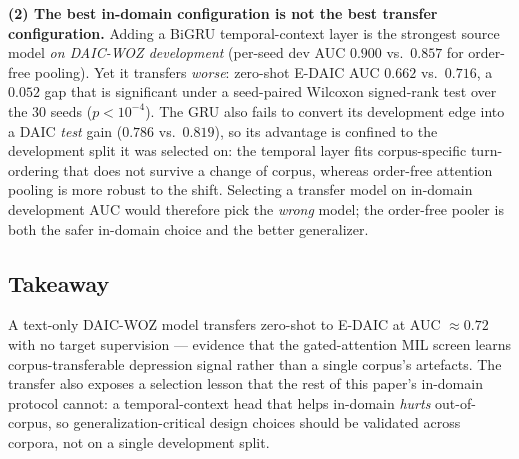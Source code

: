 \textbf{(2) The best in-domain configuration is not the best transfer
configuration.} Adding a BiGRU temporal-context layer is the strongest source
model \emph{on DAIC-WOZ development} (per-seed dev AUC $0.900$ vs.\ $0.857$ for
order-free pooling). Yet it transfers \emph{worse}: zero-shot E-DAIC AUC
$0.662$ vs.\ $0.716$, a $0.052$ gap that is significant under a seed-paired
Wilcoxon signed-rank test over the 30 seeds ($p<10^{-4}$). The GRU also fails to
convert its development edge into a DAIC \emph{test} gain ($0.786$ vs.\ $0.819$),
so its advantage is confined to the development split it was selected on: the
temporal layer fits corpus-specific turn-ordering that does not survive a change
of corpus, whereas order-free attention pooling is more robust to the shift.
Selecting a transfer model on in-domain development AUC would therefore pick the
\emph{wrong} model; the order-free pooler is both the safer in-domain choice and
the better generalizer.

\begin{table}[t]
\caption{Zero-shot cross-corpus transfer. Source: bge-large, participant-only,
gap-merged, trained on DAIC-WOZ; evaluated on E-DAIC with no target adaptation.
ROC-AUC as 30-seed per-seed mean$\pm$std; the E-DAIC column adds a subject-level
bootstrap 95\% CI (2000 resamples of the 56 test subjects) on the seed-ensemble.
The order-free model wins the transfer despite the GRU winning the DAIC
development split.}
\label{tab:edaic}
\centering\small
\setlength{\tabcolsep}{4pt}
\end{table}

\subsection{Takeaway}
\label{sec:edaic-takeaway}
A text-only DAIC-WOZ model transfers zero-shot to E-DAIC at AUC $\approx\!0.72$
with no target supervision --- evidence that the gated-attention MIL screen
learns corpus-transferable depression signal rather than a single corpus's
artefacts. The transfer also exposes a selection lesson that the rest of this
paper's in-domain protocol cannot: a temporal-context head that helps in-domain
\emph{hurts} out-of-corpus, so generalization-critical design choices should be
validated across corpora, not on a single development split.
